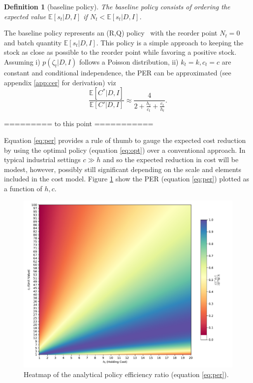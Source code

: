 \documentclass[a4paper,12pt]{article}
\newtheorem{definition}{Definition}
\begin{document}
	\begin{definition}[baseline policy]
		The baseline policy consists of ordering the expected value $\mathbb{E}[s_t|D,I]$ if $N_t<\mathbb{E}[s_t|D,I]$.
	\end{definition}
	
	The baseline policy represents an (R,Q) policy~\citep{bartmann1992inventory,axsaeter2006inventory} with the reorder point $N_t=0$ and batch quantity $\mathbb{E}[s_t|D,I]$. This policy is a simple approach to keeping the stock as close as possible to the reorder point while favoring a positive stock. Assuming i) $p(\zeta_t|D,I)$ follows a Poisson distribution, ii) $k_t=k,c_t=c$ are constant and conditional independence, the PER can be approximated (see appendix \ref{app:cer} for derivation) viz
	\begin{equation}
		\frac{\mathbb{E}[C^*|D,I] }{\mathbb{E}[C'|D,I]}\approx \frac{4}{2+\frac{h_t}{c_t}+\frac{c_t}{h_t}}.
		\label{eq:per}
	\end{equation}
	
	
	========= to this point ===========
	
	Equation \eqref{eq:per} provides a rule of thumb to gauge the expected cost reduction by using the optimal policy (equation \eqref{eq:opt}) over a conventional approach. In typical industrial settings $c\gg h$ and so the expected reduction in cost will be modest, however, possibly still significant depending on the scale and elements included in the cost model. Figure \ref{fig:heatmap_analytical} show the PER (equation \eqref{eq:per}) plotted as a function of $h,c$.
	\begin{figure}[h!]
		\centering
		\includegraphics[width=\textwidth]{figures/analytical_per.pdf}
		\caption{Heatmap of the analytical policy efficiency ratio (equation \eqref{eq:per}).}
		\label{fig:heatmap_analytical}
	\end{figure}
	
\end{document}

